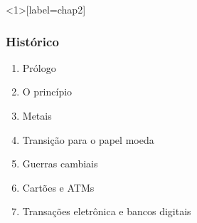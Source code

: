 \documentclass[aspectratio=43,8pt]{beamer}%
\begin{document}
\begin{frame}<1>[label=chap2]
	\frametitle{Histórico}
		\begin{keypoint}
		
		\begin{enumerate}
			\item Prólogo
\pause
			
			\item O princípio 

\pause
			
			\item Metais 
\pause
			\item Transição para o papel moeda 
\pause
			\item Guerras cambiais 
\pause
			\item Cartões e ATMs 	
\pause
		
			\item Transações eletrônica e bancos digitais 
		\end{enumerate} 
	\end{keypoint}
\end{frame}
\end{document}

